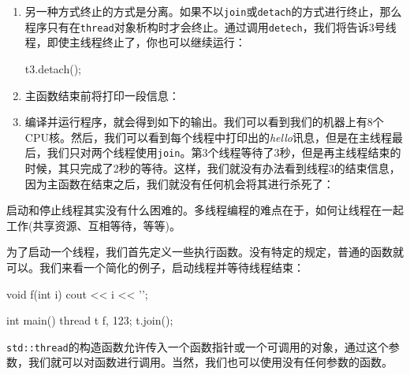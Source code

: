 \begin{enumerate}
\begin{codebox}[cpp]
    t1.join();
    t2.join();
\end{codebox}

\item 另一种方式终止的方式是分离。如果不以\texttt{join}或\texttt{detach}的方式进行终止，那么程序只有在\texttt{thread}对象析构时才会终止。通过调用\texttt{detech}，我们将告诉3号线程，即使主线程终止了，你也可以继续运行：

\begin{codebox}[cpp]
    t3.detach();
\end{codebox}

\item 主函数结束前将打印一段信息：

\begin{codebox}[cpp]
    cout << "Threads joined.\n";
}
\end{codebox}

\item 编译并运行程序，就会得到如下的输出。我们可以看到我们的机器上有8个CPU核。然后，我们可以看到每个线程中打印出的\emph{hello}讯息，但是在主线程最后，我们只对两个线程使用\texttt{join}。第3个线程等待了3秒，但是再主线程结束的时候，其只完成了2秒的等待。这样，我们就没有办法看到线程3的结束信息，因为主函数在结束之后，我们就没有任何机会将其进行杀死了：


\end{enumerate}


启动和停止线程其实没有什么困难的。多线程编程的难点在于，如何让线程在一起工作(共享资源、互相等待，等等)。

为了启动一个线程，我们首先定义一些执行函数。没有特定的规定，普通的函数就可以。我们来看一个简化的例子，启动线程并等待线程结束：

\begin{codebox}[cpp]
void f(int i) { cout << i << '\n'; }

int main()
{
    thread t {f, 123};
    t.join();
}
\end{codebox}

\texttt{std::thread}的构造函数允许传入一个函数指针或一个可调用的对象，通过这个参数，我们就可以对函数进行调用。当然，我们也可以使用没有任何参数的函数。

